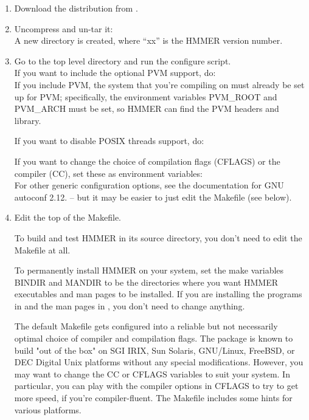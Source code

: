 \begin{enumerate}
\item Download the distribution from .

\item Uncompress and un-tar it:\\
A new directory  is created, where ``xx'' is
the HMMER version number.

\item Go to the top level directory and run the
      configure script.\\
If you want to include the optional PVM support, do:\\
If you include PVM, the system that you're compiling on must already
be set up for PVM; specifically, the environment variables PVM\_ROOT
and PVM\_ARCH must be set, so HMMER can find the PVM headers and
library.

If you want to disable POSIX threads support, do:\\

If you want to change the choice of compilation flags (CFLAGS) or the
compiler (CC), set these as environment variables:\\
For other generic configuration options, see the documentation for GNU
autoconf 2.12. -- but it may be easier to just edit the
Makefile (see below).

\item Edit the top of the Makefile. 

To build and test HMMER in its source directory, you don't need to
edit the Makefile at all. 

To permanently install HMMER on your system, set the make variables
BINDIR and MANDIR to be the directories where you want HMMER
executables and man pages to be installed. If you are installing the
programs in  and the man pages in
, you don't need to change anything.

The default Makefile gets configured into a reliable but not
necessarily optimal choice of compiler and compilation flags. The
package is known to build "out of the box" on SGI IRIX, Sun Solaris,
GNU/Linux, FreeBSD, or DEC Digital Unix platforms without any special
modifications. However, you may want to change the CC or CFLAGS
variables to suit your system.  In particular, you can play with the
compiler options in CFLAGS to try to get more speed, if you're
compiler-fluent. The Makefile includes some hints for various
platforms. 


\end{enumerate}
